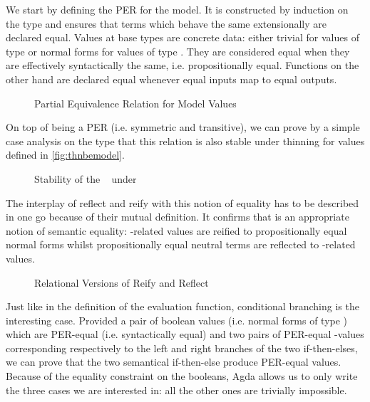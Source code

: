 We start by defining the PER for the model. It is constructed by
induction on the type and ensures that terms which behave the same
extensionally are declared equal. Values at base types are concrete
data: either trivial for values of type  or normal forms
for values of type . They are considered equal when they
are effectively syntactically the same, i.e. propositionally equal.
Functions on the other hand are declared equal whenever equal inputs
map to equal outputs.

\begin{figure}[h]
\caption{Partial Equivalence Relation for Model Values\label{fig:nbeper}}
\end{figure}

On top of being a PER (i.e. symmetric and transitive), we can prove by a
simple case analysis on the type that this relation is also stable under
thinning for  values defined in \cref{fig:thnbemodel}.

\begin{figure}[h]
\caption{Stability of the ~ under \label{fig:nbeperth}}
\end{figure}

The interplay of reflect and reify with this notion of equality has to be described
in one go because of their mutual definition. It confirms that  is an appropriate
notion of semantic equality: -related values are reified to propositionally
equal normal forms whilst propositionally equal neutral terms are reflected
to -related values.

\begin{figure}[h]
\caption{Relational Versions of Reify and Reflect\label{fig:nbeperreifyreflect}}
\end{figure}

Just like in the definition of the evaluation function, conditional branching is the
interesting case. Provided a pair of boolean values (i.e. normal forms of type
) which are PER-equal (i.e. syntactically equal) and two pairs of PER-equal
-values corresponding respectively to the left and right branches of the two
if-then-elses, we can prove that the two semantical if-then-else produce PER-equal values.
Because of the equality constraint on the booleans, Agda allows us to only write the
three cases we are interested in: all the other ones are trivially impossible.

